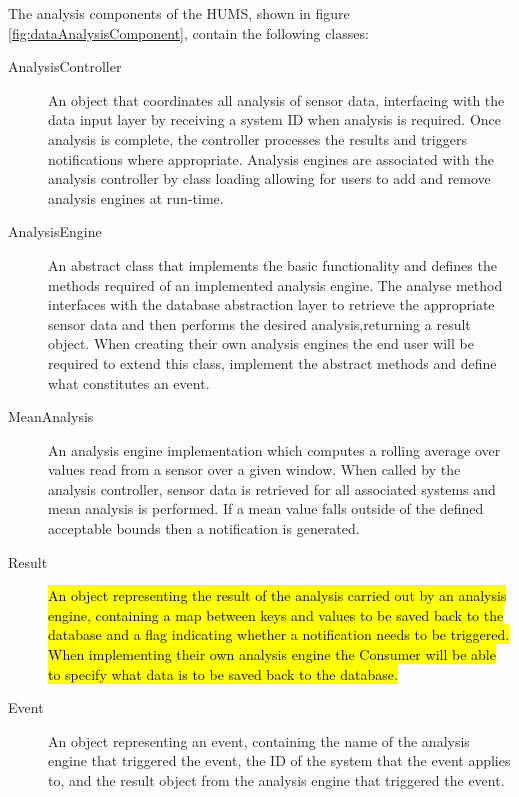 \documentclass[10pt,a4paper]{article}
\begin{document}
The analysis components of the HUMS, shown in figure
\ref{fig:dataAnalysisComponent}, contain the following classes:

\begin{description}
  \item [AnalysisController] An object that coordinates all analysis of
    sensor data, interfacing with the data input layer by
    receiving a system ID when analysis is required. Once analysis is
    complete, the controller processes the results and triggers
    notifications where appropriate. Analysis engines are associated
    with the analysis controller by class loading allowing for users to
    add and remove analysis engines at run-time.

  \item [AnalysisEngine] An abstract class that implements the basic
    functionality and defines the methods required of an implemented
    analysis engine. The analyse method interfaces with the database
    abstraction layer to retrieve the appropriate sensor data and then
    performs the desired analysis,returning a result object. When creating 
    their own analysis engines the end user will be required to extend 
    this class, implement the abstract methods and define what 
    constitutes an event.

  \item [MeanAnalysis] An analysis engine implementation which 
    computes a rolling average over values read from a sensor over
    a given window. When called by the analysis controller, sensor 
    data is retrieved for all associated systems and mean analysis 
    is performed. If a mean value falls outside of the defined acceptable 
    bounds then a notification is generated.

  \item [Result] \hl{An object representing the result of the analysis
    carried out by an analysis engine, containing a
    map between keys and values to be saved back to the database 
    and a flag indicating whether a notification needs to be triggered.
    When implementing their own analysis engine the Consumer will 
    be able to specify what data is to be saved back to the database.}

  \item [Event] An object representing an event,
    containing the name of the analysis engine that triggered the
    event, the ID of the system that the event applies
    to, and the result object from the analysis engine that triggered
    the event.
\end{description}
\end{document}
